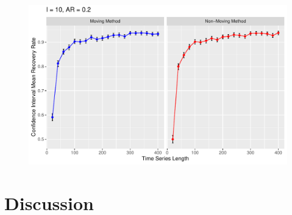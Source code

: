 \documentclass[12pt, letterpaper, titlepage]{article}
\begin{document}
\begin{figure}[]
  \centering
  \includegraphics[width=\textwidth]{constant_0.2}
  \caption{}
  \label{fig:constant_0.2}
\end{figure}

\label{sec:results}




\section{Discussion}
\label{sec:discuss}





\end{document}
